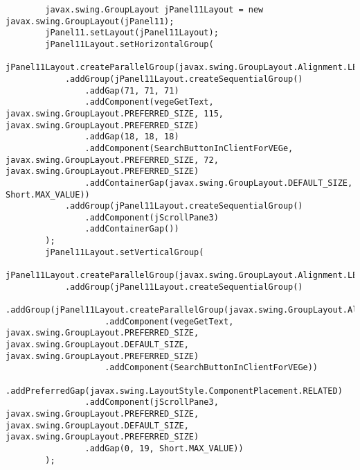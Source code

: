 \documentclass[12pt,a4paper]{article}
\begin{document}
\begin{lstlisting}
        javax.swing.GroupLayout jPanel11Layout = new javax.swing.GroupLayout(jPanel11);
        jPanel11.setLayout(jPanel11Layout);
        jPanel11Layout.setHorizontalGroup(
            jPanel11Layout.createParallelGroup(javax.swing.GroupLayout.Alignment.LEADING)
            .addGroup(jPanel11Layout.createSequentialGroup()
                .addGap(71, 71, 71)
                .addComponent(vegeGetText, javax.swing.GroupLayout.PREFERRED_SIZE, 115, javax.swing.GroupLayout.PREFERRED_SIZE)
                .addGap(18, 18, 18)
                .addComponent(SearchButtonInClientForVEGe, javax.swing.GroupLayout.PREFERRED_SIZE, 72, javax.swing.GroupLayout.PREFERRED_SIZE)
                .addContainerGap(javax.swing.GroupLayout.DEFAULT_SIZE, Short.MAX_VALUE))
            .addGroup(jPanel11Layout.createSequentialGroup()
                .addComponent(jScrollPane3)
                .addContainerGap())
        );
        jPanel11Layout.setVerticalGroup(
            jPanel11Layout.createParallelGroup(javax.swing.GroupLayout.Alignment.LEADING)
            .addGroup(jPanel11Layout.createSequentialGroup()
                .addGroup(jPanel11Layout.createParallelGroup(javax.swing.GroupLayout.Alignment.BASELINE)
                    .addComponent(vegeGetText, javax.swing.GroupLayout.PREFERRED_SIZE, javax.swing.GroupLayout.DEFAULT_SIZE, javax.swing.GroupLayout.PREFERRED_SIZE)
                    .addComponent(SearchButtonInClientForVEGe))
                .addPreferredGap(javax.swing.LayoutStyle.ComponentPlacement.RELATED)
                .addComponent(jScrollPane3, javax.swing.GroupLayout.PREFERRED_SIZE, javax.swing.GroupLayout.DEFAULT_SIZE, javax.swing.GroupLayout.PREFERRED_SIZE)
                .addGap(0, 19, Short.MAX_VALUE))
        );


\end{lstlisting}
\end{document}
